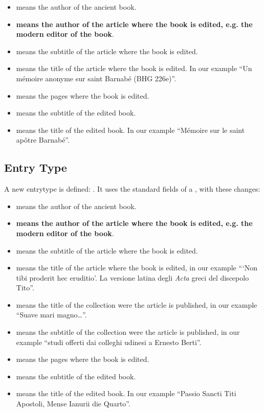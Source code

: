 \documentclass{ltxdockit}[2011/03/25]
\begin{document}
\begin{itemize}
	\item {} means the author of the ancient book.
	\item \textbf{ means the author of the article where the book is edited, e.g. the modern editor of the book}.
	\item {} means the subtitle of the article where the book is edited.
	\item {} means the title of the article where the book is edited. In our example \enquote{Un mémoire anonyme sur saint Barnabé (BHG 226e)}.
	\item {} means the pages where the book is edited.
	\item {} means the subtitle of the edited book.
	\item {} means the title of the edited book. In our example \enquote{Mémoire sur le saint apôtre Barnabé}.


\end{itemize}


\subsection{ Entry Type}

A new entrytype is defined: . It uses the standard fields of a , with these changes:

\begin{itemize}
	\item {} means the author of the ancient book.
	\item \textbf{ means the author of the article where the book is edited, e.g. the modern editor of the book}.
	\item {} means the subtitle of the article where the book is edited.
	\item {} means the title of the article where the book is edited, in our example \enquote{\enquote{Non tibi proderit hec eruditio}. La versione latina degli \emph{Acta} greci del discepolo Tito}. 
	\item {} means the title of the collection were the article is published, in our example \enquote{Suave mari magno\ldots}.
	\item {} means the subtitle of the collection were the article is published, in our example \enquote{studi offerti dai colleghi udinesi a Ernesto Berti}.
	\item {} means the pages where the book is edited.
	\item {} means the subtitle of the edited book.
	\item {} means the title of the edited book. In our example \enquote{Passio Sancti Titi Apostoli, Mense Ianurii die Quarto}.


\end{itemize}
\end{document}
